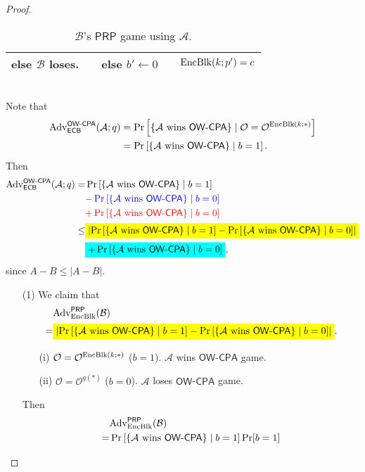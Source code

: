 \documentclass[12pt,openany]{book}
\newcommand{\mathcolorbox}[2]{\colorbox{#1}{$\displaystyle #2$}}
\theoremstyle{definition}
\newcommand{\set}[1]{\left\{#1\right\}}
\newcommand{\abs}[1]{\left\lvert #1 \right\rvert}
\newcommand{\A}{\mathcal{A}}
\newcommand{\oracle}{\mathcal{O}}
\newcommand{\ECB}{\mathsf{ECB}}
\newcommand{\OW}{\mathsf{OW}}
\newcommand{\PRP}{\mathsf{PRP}}
\newcommand{\CPA}{\mathsf{CPA}}
\newcommand{\Adv}{\textnormal{Adv}}
\newcommand{\EncBlk}{\textnormal{EncBlk}}
\begin{document}
\begin{proof}
\begin{table}[h]
\begin{tabular}{ccccc}
				else $\mathcal{B}$ loses. & & else $b'\gets 0$ & & $\EncBlk(k;p')=c$\\
				\bottomrule[1.5pt]
			\end{tabular}
		\caption{$\mathcal{B}$'s $\PRP$ game using $\A$.}
		\end{table}\\
		Note that \begin{align*}
			\Adv_{\ECB}^{\OW\text{-}\CPA}(\A;q)&=\Pr\left[\set{\text{$\A$ wins $\OW$-$\CPA$}}\mid\oracle=\oracle^{\EncBlk(k;*)}\right]\\
			&=\Pr\left[\set{\text{$\A$ wins $\OW$-$\CPA$}}\mid b=1\right].
		\end{align*}
		Then \begin{align*}
			\Adv_{\ECB}^{\OW\text{-}\CPA}(\A;q)
			=&\Pr\left[\set{\text{$\A$ wins $\OW$-$\CPA$}}\mid b=1\right]\\
			&\textcolor{blue}{-\Pr\left[\set{\text{$\A$ wins $\OW$-$\CPA$}}\mid b=0\right]}\\
			&\textcolor{red}{+\Pr\left[\set{\text{$\A$ wins $\OW$-$\CPA$}}\mid b=0\right]}\\
			\leq&\mathcolorbox{-blue}{\abs{\Pr\left[\set{\text{$\A$ wins $\OW$-$\CPA$}}\mid b=1\right]-\Pr\left[\set{\text{$\A$ wins $\OW$-$\CPA$}}\mid b=0\right]}}\\
			&\mathcolorbox{-red}{+\Pr\left[\set{\text{$\A$ wins $\OW$-$\CPA$}}\mid b=0\right]},
		\end{align*} since $A-B\leq\abs{A-B}$.
		\begin{enumerate}
			\item[(1)] We claim that \begin{align*}
			&\Adv_{\textnormal{EncBlk}}^{\PRP}(\mathcal{B})\\
			=&\mathcolorbox{-blue}{\abs{\Pr\left[\set{\text{$\A$ wins $\OW$-$\CPA$}}\mid b=1\right]-\Pr\left[\set{\text{$\A$ wins $\OW$-$\CPA$}}\mid b=0\right]}}.
			\end{align*}
			\begin{enumerate}
				\item[(i)] $\oracle=\oracle^{\EncBlk(k;*)}$ ($b=1$). $\A$ wins $\OW$-$\CPA$ game.
				\item[(ii)] $\oracle=\oracle^{g(*)}$ ($b=0$). $\A$ loses $\OW$-$\CPA$ game.
			\end{enumerate} Then \begin{align*}
					&\Adv_{\textnormal{EncBlk}}^{\PRP}(\mathcal{B})\\
					=&\Pr\left[\set{\text{$\A$ wins $\OW$-$\CPA$}}\mid b=1\right]\Pr[b=1]\\

\end{align*}
\end{enumerate}
\end{proof}
\end{document}
